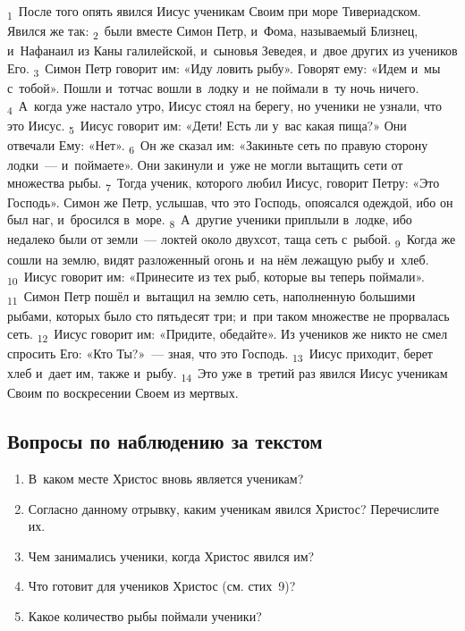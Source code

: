 \documentclass[a4paper,12pt]{article}
\begin{document}
\textsubscript{1}~После того опять явился Иисус ученикам Своим при море Тивериадском. Явился же так:
\textsubscript{2}~были вместе Симон Петр, и~Фома, называемый Близнец, и~Нафанаил из Каны галилейской, и~сыновья Зеведея, и~двое других из учеников Его.
\textsubscript{3}~Симон Петр говорит им: «Иду ловить рыбу». Говорят ему: «Идем и~мы с~тобой». Пошли и~тотчас вошли в~лодку и~не поймали в~ту ночь ничего.
\textsubscript{4}~А~когда уже настало утро, Иисус стоял на берегу, но ученики не узнали, что это Иисус.
\textsubscript{5}~Иисус говорит им: «Дети! Есть ли у~вас какая пища?» Они отвечали Ему: «Нет».
\textsubscript{6}~Он же сказал им: «Закиньте сеть по правую сторону лодки~--- и~поймаете». Они закинули и~уже не могли вытащить сети от множества рыбы.
\textsubscript{7}~Тогда ученик, которого любил Иисус, говорит Петру: «Это Господь». Симон же Петр, услышав, что это Господь, опоясался одеждой, ибо он был наг, и~бросился в~море.
\textsubscript{8}~А~другие ученики приплыли в~лодке, ибо недалеко были от земли~--- локтей около двухсот, таща сеть с~рыбой.
\textsubscript{9}~Когда же сошли на землю, видят разложенный огонь и~на нём лежащую рыбу и~хлеб.
\textsubscript{10}~Иисус говорит им: «Принесите из тех рыб, которые вы теперь поймали».
\textsubscript{11}~Симон Петр пошёл и~вытащил на землю сеть, наполненную большими рыбами, которых было сто пятьдесят три; и~при таком множестве не прорвалась сеть.
\textsubscript{12}~Иисус говорит им: «Придите, обедайте». Из учеников же никто не смел спросить Его: «Кто Ты?»~--- зная, что это Господь.
\textsubscript{13}~Иисус приходит, берет хлеб и~дает им, также и~рыбу.
\textsubscript{14}~Это уже в~третий раз явился Иисус ученикам Своим по воскресении Своем из мертвых. 

\subsection*{Вопросы по наблюдению за текстом}
\begin{enumerate}
    \item В~каком месте Христос вновь является ученикам? 
    
    \myline
    
    \myline
    \item Согласно данному отрывку, каким ученикам явился Христос? Перечислите их. 
    
    \myline
    
    \myline
    \item Чем занимались ученики, когда Христос явился им? 
    
    \myline
    
    \myline
    \item Что готовит для учеников Христос (см. стих~9)? 
    
    \myline
    
    \myline
    \item Какое количество рыбы поймали ученики? 
    
    \myline
    
    \myline
\end{enumerate}
\end{document}
